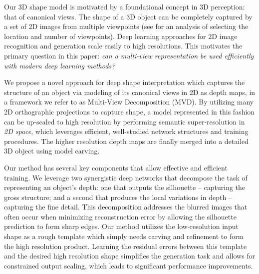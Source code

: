 \documentclass{article}
\begin{document}
Our 3D shape model is motivated by a foundational concept in 3D perception: that of canonical views. The shape of a 3D object can be completely captured by a set of 2D images from multiple viewpoints (see \cite{luong1996canonical,denton2004selecting} for an analysis of selecting the location and number of viewpoints). Deep learning approaches for 2D image recognition and generation \cite{VGG, he2016deep, GAN, karras2018progressive} scale easily to high resolutions. This motivates the primary question in this paper: \textit{can a multi-view representation be used efficiently with modern deep learning methods?} 

We propose a novel approach for deep shape interpretation which captures the structure of an object via modeling of its canonical views in 2D as depth maps, in a framework we refer to as Multi-View Decomposition (MVD). By utilizing many 2D orthographic projections to capture shape, a model represented in this fashion can be up-scaled to high resolution by performing semantic super-resolution in \textit{2D space}, which leverages efficient, well-studied network structures and training procedures. The higher resolution depth maps are finally merged into a detailed 3D object using model carving.

Our method has several key components that allow effective and efficient training. We leverage two synergistic deep networks that decompose the task of representing an object's depth: one that outputs the silhouette -- capturing the gross structure; and a second that produces the local variations in depth -- capturing the fine detail. This decomposition addresses the blurred images that often occur when minimizing reconstruction error by allowing the silhouette prediction to form sharp edges. Our method utilizes the low-resolution input shape as a rough template which simply needs carving and refinement to form the high resolution product.
Learning the residual errors between this template and the desired high resolution shape simplifies the generation task and allows for constrained output scaling, which leads to significant performance improvements.  
\end{document}
